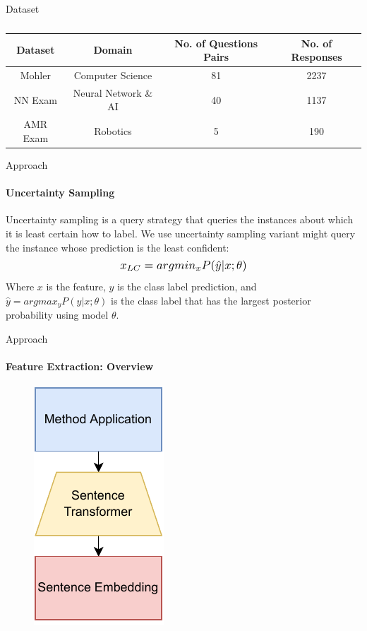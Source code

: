 \documentclass[aspectratio=169]{beamer}
\begin{document}
\begin{frame}{Dataset}
\begin{table}
	\begin{tabular}{|c|c|c|c|}
		\hline
		 Dataset & Domain & No. of Questions Pairs & No. of Responses\\
		\hline 
		Mohler \footfullcite{mohler-etal-2011-learning}& Computer Science& 81 & 2237 \\
		\hline
		NN Exam & Neural Network \& AI & 40 & 1137 \\
		\hline
		AMR Exam & Robotics & 5 & 190 \\
		\hline
	\end{tabular}
	\caption{}
\end{table}
\end{frame}
\begin{frame}{Approach}
\framesubtitle{Uncertainty Sampling}
Uncertainty sampling is a query strategy that queries the instances about which it is least certain how to label. We use uncertainty sampling variant might query the instance whose prediction is the least confident:
\begin{equation}
\label{equation:uncertainty sampling}
\scalebox{1.2}{$x_{LC} = argmin_{x} P({\hat{y}|x;\theta})$}
\end{equation}
Where $x$ is the feature, $y$ is the class label prediction, and $\hat{y} = argmax_y P({y|x;\theta})$ is the class label that has the largest posterior probability using model $\theta$.
\end{frame}
\begin{frame}{Approach}
\framesubtitle{Feature Extraction: Overview}
\begin{figure}
	\centering
	\includegraphics[scale = 0.65]{images/feature_extraction.pdf}
	\label{fig:feature extraction}
\end{figure}
\end{frame}
\end{document}
